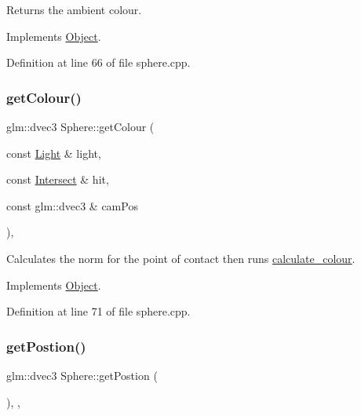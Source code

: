 Returns the ambient colour. 



Implements \mbox{\hyperlink{class_object_a96a5bb5dcad4c340caa1d806fb5bd572}{Object}}.



Definition at line 66 of file sphere.\+cpp.

\mbox{\label{class_sphere_ac5c6bbcd43b8caabe4a23ba3e53d414a}} 
\subsubsection{\texorpdfstring{get\+Colour()}{getColour()}\hspace{0.1cm}{\footnotesize\ttfamily [2/2]}}
{\footnotesize\ttfamily glm\+::dvec3 Sphere\+::get\+Colour (\begin{DoxyParamCaption}\item[{const \mbox{\hyperlink{class_light}{Light}} \&}]{light,  }\item[{const \mbox{\hyperlink{struct_intersect}{Intersect}} \&}]{hit,  }\item[{const glm\+::dvec3 \&}]{cam\+Pos }\end{DoxyParamCaption})\hspace{0.3cm}{\ttfamily [override]}, {\ttfamily [virtual]}}



Calculates the norm for the point of contact then runs \mbox{\hyperlink{util_8h_add552e26ff1418c78cbcb09b18ab0f44}{calculate\+\_\+colour}}. 



Implements \mbox{\hyperlink{class_object_abecc5668197c7222b5c9180a9738f69b}{Object}}.



Definition at line 71 of file sphere.\+cpp.

\mbox{\label{class_sphere_abcc01a6057eb30df9605ce3786b6c47c}} 
\subsubsection{\texorpdfstring{get\+Postion()}{getPostion()}}
{\footnotesize\ttfamily glm\+::dvec3 Sphere\+::get\+Postion (\begin{DoxyParamCaption}{ }\end{DoxyParamCaption})\hspace{0.3cm}{\ttfamily [inline]}, {\ttfamily [override]}, {\ttfamily [virtual]}}



